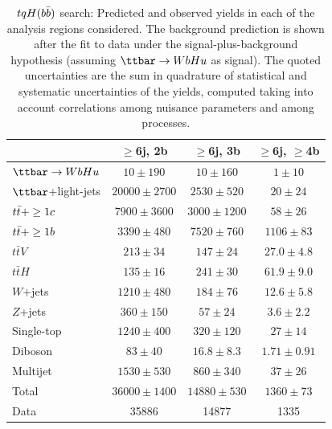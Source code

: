 \begin{table}[htbp]
\begin{center}
\begin{tabular}{l*{3}{c}}
\hline\hline
 & $\geq$6j, 2b & $\geq$6j, 3b & $\geq$6j, $\geq$4b \\
\hline
$\Hu$ &   $ 10 \pm 190 $ &   $ 10 \pm 160 $ &   $ 1 \pm 10 $ \\ 
\hline
$\ttbar$+light-jets  &   $ 20000 \pm 2700 $ &   $ 2530 \pm 520 $ &   $ 20 \pm 24 $ \\ 
$t\bar{t}+\geq1c$  &   $ 7900 \pm 3600 $ &   $ 3000 \pm 1200 $ &   $ 58 \pm 26 $ \\ 
$t\bar{t}+\geq1b$  &   $ 3390 \pm 480 $ &   $ 7520 \pm 760 $ &   $ 1106 \pm 83 $ \\ 
$t\bar{t}V$  &   $ 213 \pm 34 $ &   $ 147 \pm 24 $ &   $ 27.0 \pm 4.8 $ \\ 
$t\bar{t}H$  &   $ 135 \pm 16 $ &   $ 241 \pm 30 $ &   $ 61.9 \pm 9.0 $ \\ 
$W$+jets  &   $ 1210 \pm 480 $ &   $ 184 \pm 76 $ &   $ 12.6 \pm 5.8 $ \\ 
$Z$+jets  &   $ 360 \pm 150 $ &   $ 57 \pm 24 $ &   $ 3.6 \pm 2.2 $ \\ 
Single-top  &   $ 1240 \pm 400 $ &   $ 320 \pm 120 $ &   $ 27 \pm 14 $ \\ 
Diboson  &   $ 83 \pm 40 $ &   $ 16.8 \pm 8.3 $ &   $ 1.71 \pm 0.91 $ \\ 
Multijet  &   $ 1530 \pm 530 $ &   $ 860 \pm 340 $ &   $ 37 \pm 26 $ \\ 
\hline
Total &   $ 36000 \pm 1400 $ &   $ 14880 \pm 530 $ &   $ 1360 \pm 73 $ \\ 
\hline
Data & 35886  & 14877  & 1335  \\
\hline\hline      
\end{tabular}

%
\end{center}
\caption{
$tqH(b\bar{b})$ search: Predicted and observed yields in each of the analysis regions considered.
The background prediction is shown after the fit to data under the signal-plus-background hypothesis (assuming $\Hu$ as signal).
The quoted uncertainties are the sum in quadrature of statistical and systematic uncertainties of the yields, 
computed taking into account correlations among nuisance parameters and among processes.
}
\label{tab:Hbb_Postfit_Yields_Unblind_Hu}
\end{table}

\clearpage

